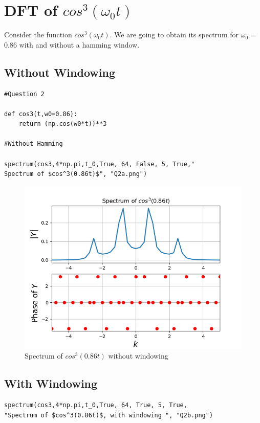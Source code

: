 \documentclass[12pt, a4paper]{report}
\begin{document}
 \section*{DFT of $cos^3(\omega_0t)$} 
   Consider the function $cos^3(\omega_0t)$. We are going to obtain its spectrum for $\omega_0$ = 0.86 with and without a hamming window.
 \small

 \subsection*{Without Windowing}
 
 \normalsize
  \begin{Verbatim}
#Question 2

def cos3(t,w0=0.86):
    return (np.cos(w0*t))**3

#Without Hamming

spectrum(cos3,4*np.pi,t_0,True, 64, False, 5, True,"
Spectrum of $cos^3(0.86t)$", "Q2a.png")
\end{Verbatim}

 \begin{figure}[!tbh]
   	\centering
   	\includegraphics[scale=0.7]{Q2a.png}
	\caption{Spectrum of $cos^3(0.86t)$ without windowing}
 \end{figure} 
 

  \subsection*{With Windowing}
 
 \normalsize
  \begin{Verbatim}
spectrum(cos3,4*np.pi,t_0,True, 64, True, 5, True, 
"Spectrum of $cos^3(0.86t)$, with windowing ", "Q2b.png")
\end{Verbatim}
 
\end{document}
